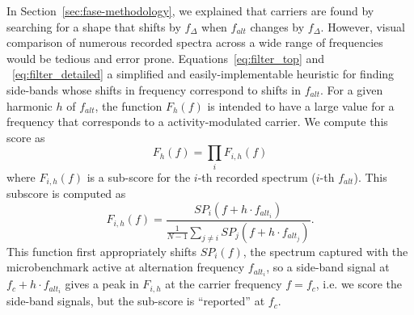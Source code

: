 
In Section~\ref{sec:fase-methodology}, we explained that carriers are found by searching for a shape that shifts by $f_\Delta$ when $f_{alt}$ changes by $f_\Delta$. However, visual comparison of numerous recorded spectra across a wide range of frequencies would be tedious and error prone. Equations~\ref{eq:filter_top} and ~\ref{eq:filter_detailed} a simplified and easily-implementable heuristic for finding side-bands whose shifts in frequency correspond to shifts in $f_{alt}$. For a given harmonic $h$ of $f_{alt}$, the function $F_h(f)$ is intended to have a large value for a frequency that corresponds to a activity-modulated carrier. We compute this score as 
\begin{equation}
F_h(f) = \prod_i F_{i,h}(f)
\label{eq:filter_top}
\end{equation} 
where $F_{i,h}(f)$ is a sub-score for the $i$-th recorded spectrum ($i$-th $f_{alt}$). This subscore is computed as 
\begin{equation}
F_{i,h}(f) = \frac{SP_i(f+h\cdot f_{alt_i})}{\frac{1}{N-1}\sum_{j \neq i} SP_j(f+h\cdot f_{alt_j})}.
\label{eq:filter_detailed}
\end{equation}
This function first appropriately shifts $SP_i(f)$, the spectrum captured with the microbenchmark active at alternation frequency $f_{alt_i}$, so a side-band signal at $f_c+h\cdot f_{alt_i}$ gives a peak in $F_{i,h}$ at the carrier frequency $f=f_c$, i.e. we score the side-band signals, but the sub-score is ``reported'' at $f_c$.


